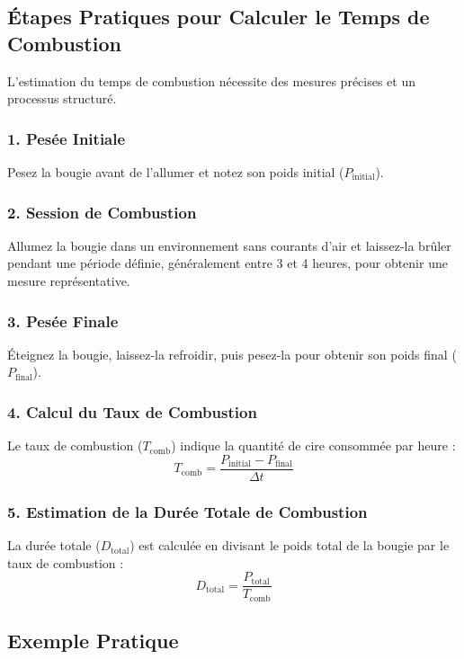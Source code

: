\documentclass[11pt,fleqn,onecolumn,oneside]{book}
\begin{document}
\subsection*{Étapes Pratiques pour Calculer le Temps de Combustion}

L’estimation du temps de combustion nécessite des mesures précises et un processus structuré.

\subsubsection*{1. Pesée Initiale}
Pesez la bougie avant de l’allumer et notez son poids initial (\( P_{\text{initial}} \)).

\subsubsection*{2. Session de Combustion}
Allumez la bougie dans un environnement sans courants d’air et laissez-la brûler pendant une période définie, généralement entre 3 et 4 heures, pour obtenir une mesure représentative.

\subsubsection*{3. Pesée Finale}
Éteignez la bougie, laissez-la refroidir, puis pesez-la pour obtenir son poids final (\( P_{\text{final}} \)).

\subsubsection*{4. Calcul du Taux de Combustion}
Le taux de combustion (\( T_{\text{comb}} \)) indique la quantité de cire consommée par heure :
\[
T_{\text{comb}} = \frac{P_{\text{initial}} - P_{\text{final}}}{\Delta t}
\]

\subsubsection*{5. Estimation de la Durée Totale de Combustion}
La durée totale (\( D_{\text{total}} \)) est calculée en divisant le poids total de la bougie par le taux de combustion :
\[
D_{\text{total}} = \frac{P_{\text{total}}}{T_{\text{comb}}}
\]

\subsection*{Exemple Pratique}
\end{document}
